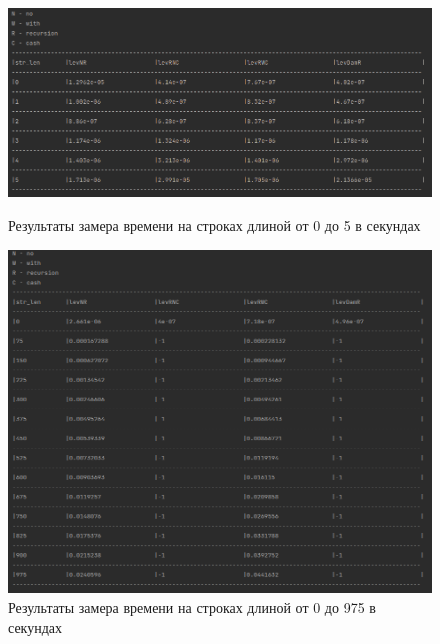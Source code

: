     \begin{figure}[h!]
        \centering
        \includegraphics[scale=0.7]{img/TimeTable5Elems}
        \caption{Результаты замера времени на строках длиной от 0 до 5 в секундах}
        \label{fig:1}

        \includegraphics[scale=0.7]{img/TimeTable975Elems}
        \caption{Результаты замера времени на строках длиной от 0 до 975 в секундах}
        \label{fig:2}
    \end{figure}

